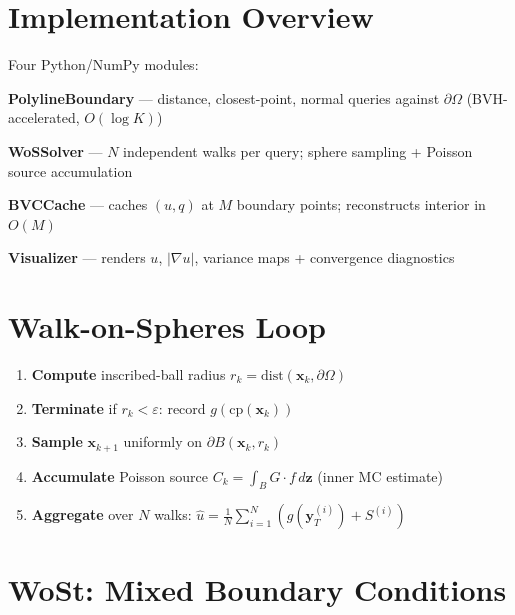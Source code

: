 \documentclass[11pt]{article}
\begin{document}
\section{Implementation Overview}

Four Python/NumPy modules:

\begin{tcolorbox}[colback=lightbg,colframe=accent,boxrule=0.5pt,arc=2pt,left=6pt,right=6pt,top=4pt,bottom=4pt]
\textbf{PolylineBoundary} --- distance, closest-point, normal queries against $\partial\Omega$ (BVH-accelerated, $O(\log K)$)

\textbf{WoSSolver} --- $N$ independent walks per query; sphere sampling + Poisson source accumulation

\textbf{BVCCache} --- caches $(u, q)$ at $M$ boundary points; reconstructs interior in $O(M)$

\textbf{Visualizer} --- renders $u$, $|\nabla u|$, variance maps + convergence diagnostics
\end{tcolorbox}

\section{Walk-on-Spheres Loop}

\begin{enumerate}[topsep=2pt,itemsep=2pt,leftmargin=12pt]
  \item \textbf{Compute} inscribed-ball radius $r_k = \mathrm{dist}(\mathbf{x}_k, \partial\Omega)$
  \item \textbf{Terminate} if $r_k < \varepsilon$: record $g(\mathrm{cp}(\mathbf{x}_k))$
  \item \textbf{Sample} $\mathbf{x}_{k+1}$ uniformly on $\partial B(\mathbf{x}_k, r_k)$
  \item \textbf{Accumulate} Poisson source $C_k = \int_B G \cdot f \, d\mathbf{z}$ (inner MC estimate)
  \item \textbf{Aggregate} over $N$ walks:
  $\widehat{u} = \frac{1}{N}\sum_{i=1}^{N}(g(\mathbf{y}_T^{(i)}) + S^{(i)})$
\end{enumerate}

\section{WoSt: Mixed Boundary Conditions}
\end{document}
